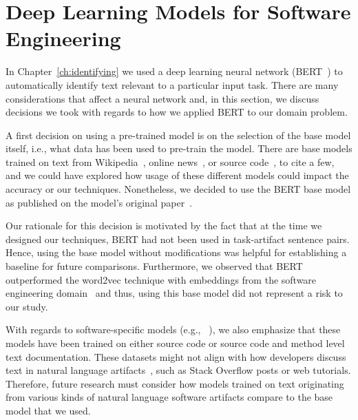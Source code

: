 


\section{Deep Learning Models for Software Engineering}
\label{cp7:deep-learning}




In Chapter~\ref{ch:identifying} we used a deep learning neural network (BERT~\cite{Devlin2018Bert})
to automatically identify text relevant to a particular input task. There are many considerations 
that affect a neural network and, in this section, we discuss decisions we took 
with regards to how we applied BERT to our domain problem. 



A first decision on using a pre-trained model is on the selection of the base model itself, i.e., what data has been used to pre-train the model. 
There are base models trained on text from Wikipedia~\cite{Devlin2018Bert},  online news~\cite{peters2018elmo}, 
or source code~\cite{feng2020-codebert}, to  cite a few,
and we could have explored how usage of these different models could impact the accuracy or our 
techniques. Nonetheless, we decided to use 
the BERT base model as published on the model's original paper~\cite{Devlin2018Bert}.


Our rationale for this decision is motivated by the fact that at the time we designed our techniques, 
BERT had not been used in task-artifact sentence pairs.
Hence, using the base model without modifications
was helpful for establishing a baseline for future comparisons.
Furthermore,  we observed that BERT outperformed 
the word2vec technique with embeddings from the software engineering domain~\cite{Efstathiou2018}
and thus, using this base model did not represent a risk to our study.


With regards to software-specific models (e.g., ~\cite{feng2020-codebert, li2019neural}), we also emphasize 
that these models have been trained on either source code or source code and method level text documentation. 
These datasets might not align with how developers discuss text in natural language artifacts~\cite{arya2020}, such 
as Stack Overflow posts or web tutorials. Therefore, future research must consider how 
 models trained on text originating from various kinds of 
natural language software artifacts compare to the base model that we used.




